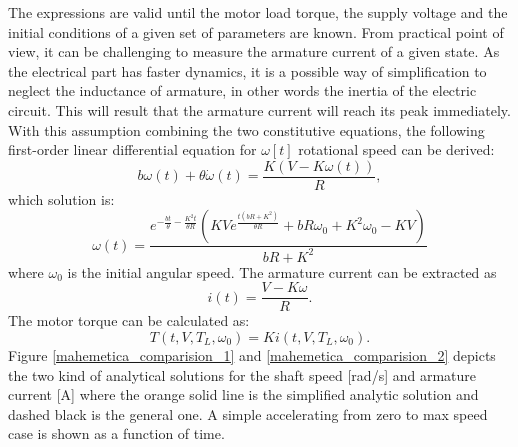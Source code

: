\documentclass[12pt,english,twoside]{article}
\begin{document}
The expressions are valid until the motor load torque, the supply voltage and the initial conditions of a given set of parameters are known. From practical point of view, it can be challenging to measure the armature current of a given state. As the electrical part has faster dynamics, it is a possible way of simplification to neglect the inductance of armature, in other words the inertia of the electric circuit. This will result that the armature current will reach its peak immediately.  With this assumption combining the two constitutive equations, the following first-order linear differential equation for $\omega[t]$ rotational speed can be derived:
\begin{equation}
	b \omega(t)+\theta \dot \omega(t)=\frac{K (V-K \omega(t))}{R},
\end{equation} 
which solution is:
\begin{equation}
	\omega(t) = \frac{e^{-\frac{b t}{\theta }-\frac{K^2 t}{\theta  R}} \left(K V e^{\frac{t \left(b R+K^2\right)}{\theta  R}}+b R \text{$\omega_0 $}+K^2 \text{$\omega_0 $}-K V\right)}{b R+K^2}
\end{equation}
where $\omega_0$ is the initial angular speed.
The armature current can be extracted as
\begin{equation}
	i(t) =\frac{V-K\omega}{R}.
\end{equation}
The motor torque can be calculated as:
\begin{equation}
T(t,V,T_L,\omega_0) = K i(t,V,T_L,\omega_0).
\end{equation}
Figure \ref{mahemetica_comparision_1} and \ref{mahemetica_comparision_2} depicts the two kind of analytical solutions for the shaft speed [rad/s] and armature current [A] where the orange solid line is the simplified analytic solution and dashed black is the general one. A simple accelerating from zero to max speed case is shown as a function of time.
\end{document}
